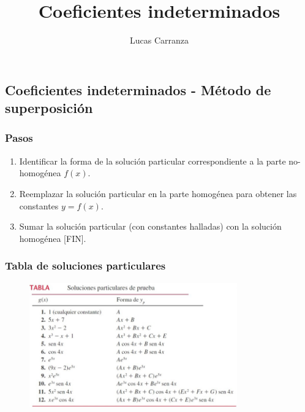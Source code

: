 \documentclass{report}
\title{\Huge{Coeficientes indeterminados}}
\author{\huge{Lucas Carranza}}
\date{}
\begin{document}
\maketitle
\newpage

\chapter{}
\section{Coeficientes indeterminados - Método de superposición}

\subsection{Pasos}

\begin{enumerate}
\item Identificar la forma de la solución particular correspondiente a la parte no-homogénea $f(x)$.

\item Reemplazar la solución particular en la parte homogénea para obtener las constantes $y = f(x)$.

\item Sumar la solución particular (con constantes halladas) con la solución homogénea [FIN].
\end{enumerate}

\subsection{Tabla de soluciones particulares}

\begin{figure}[h]
    \centering
    \includegraphics[width=0.8\textwidth]{tabla.png}
\end{figure}
\end{document}

